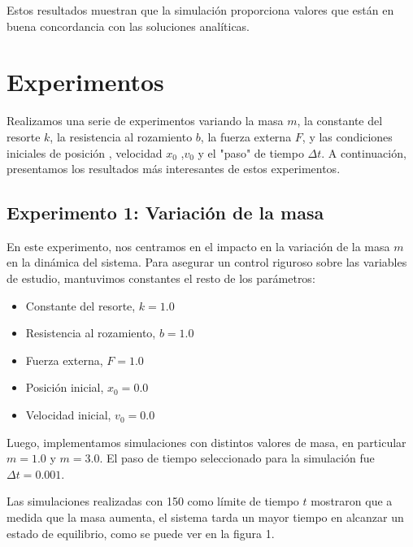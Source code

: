 \documentclass[]{article}
\begin{document}
Estos resultados muestran que la simulación proporciona valores que están en buena concordancia con las soluciones analíticas.

\section{Experimentos}
Realizamos una serie de experimentos variando la masa $m$, la constante del resorte $k$, la resistencia al rozamiento $b$, la fuerza externa $F$, y las condiciones iniciales de posición  , velocidad $x_0$ ,$v_0$ y el "paso" de tiempo $\Delta t$. A continuación, presentamos los resultados más interesantes de estos experimentos.

\subsection{Experimento 1: Variación de la masa}
En este experimento, nos centramos en el impacto en  la variación de la masa $m$ en la dinámica del sistema. Para asegurar un control riguroso sobre las variables de estudio, mantuvimos constantes el resto de los parámetros:

\begin{itemize}
\item Constante del resorte, $k = 1.0$
\item Resistencia al rozamiento, $b = 1.0$
\item Fuerza externa, $F = 1.0$
\item Posición inicial, $x_0 = 0.0$
\item Velocidad inicial, $v_0 = 0.0$
\end{itemize}

Luego, implementamos simulaciones con distintos valores de masa, en particular $m = 1.0$ y $m = 3.0$. El paso de tiempo seleccionado para la simulación fue $\Delta t= 0.001$.

Las simulaciones realizadas con 150 como límite de tiempo $t$ mostraron que a medida que la masa aumenta, el sistema tarda un mayor tiempo en alcanzar un estado de equilibrio, como se puede ver en la figura 1.


\end{document}
